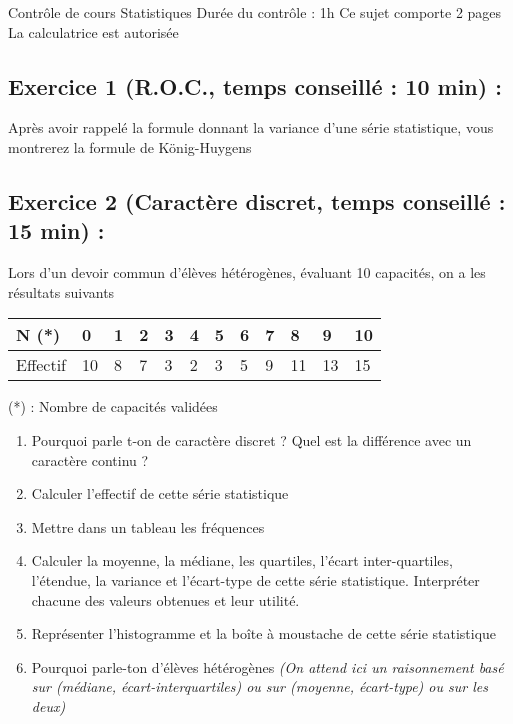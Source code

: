 

\usepackage[c]{esvect}
\newcommand{\covec}[2]{\begin{pmatrix}#1 \\#2 \end{pmatrix}}


\center
\Large Contrôle de cours
\flushleft
\center
Statistiques
\flushleft \normalsize
Durée du contrôle : 1h\newline
Ce sujet comporte 2 pages\newline
La calculatrice est autorisée
\subsection*{Exercice 1 (R.O.C., temps conseillé : 10 min) : }
Après avoir rappelé la formule donnant la variance d'une série statistique, vous montrerez la formule de König-Huygens
\subsection*{Exercice 2 (Caractère discret, temps conseillé : 15 min) : }
Lors d'un devoir commun d'élèves hétérogènes, évaluant 10 capacités, on a les résultats suivants\newline

\begin{tabularx}{\linewidth}{|X|X|X|X|X|X|X|X|X|X|X|X|}
\hline
N (*) & 0 & 1 & 2 & 3 & 4 & 5 & 6 & 7 & 8 & 9 & 10\\ \hline
Effectif & 10 & 8 & 7 & 3 & 2 & 3 & 5 &9 & 11 & 13 & 15 \\ \hline
\end{tabularx}\newline

(*) : Nombre de capacités validées
\begin{enumerate}
\item Pourquoi parle t-on de caractère discret ? Quel est la différence avec un caractère continu ?
\item Calculer l'effectif de cette série statistique
\item Mettre dans un tableau les fréquences
\item Calculer la moyenne, la médiane, les quartiles, l'écart inter-quartiles, l'étendue, la variance et l'écart-type de cette série statistique. Interpréter chacune des valeurs obtenues et leur utilité. 
\item Représenter l'histogramme et la boîte à moustache de cette série statistique
\item Pourquoi parle-ton d'élèves hétérogènes \emph{(On attend ici un raisonnement basé sur (médiane, écart-interquartiles) ou sur (moyenne, écart-type) ou sur les deux)}
\end{enumerate}
